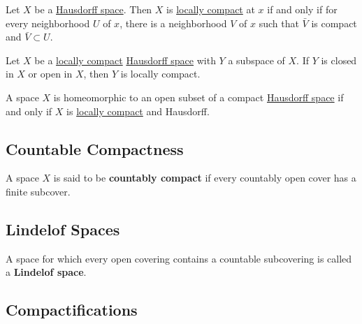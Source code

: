   \begin{lemma}
    \label{thm:local-compactness-in-hausdorff-spaces}
    Let $X$ be a \hyperref[def:hausdorff-space]{Hausdorff space}. Then $X$ is \hyperref[def:locally-compact]{locally compact} at $x$ if and only if for every neighborhood $U$ of $x$, there is a neighborhood $V$ of $x$ such that $\bar{V}$ is compact and $\bar{V} \subset U$. 
  \end{lemma}

  \begin{corollary}
    \label{thm:subspaces-of-locally-compact-hausdorff-spaces}
    Let $X$ be a \hyperref[def:locally-compact]{locally compact} \hyperref[def:hausdorff-space]{Hausdorff space} with $Y$ a subspace of $X$. If $Y$ is closed in $X$ or open in $X$, then $Y$ is locally compact. 
  \end{corollary}

  \begin{corollary}
    \label{thm:local-compactness-via-open-embedding}
    A space $X$ is homeomorphic to an open subset of a compact \hyperref[def:hausdorff-space]{Hausdorff space} if and only if $X$ is \hyperref[def:locally-compact]{locally compact} and Hausdorff. 
  \end{corollary}

\subsection{Countable Compactness}

  \begin{definition}
    \label{def:countably-compact}
    A space $X$ is said to be \textbf{countably compact} if every countably open cover has a finite subcover. 
  \end{definition}

\subsection{Lindelof Spaces} 

  \begin{definition}
    \label{def:lindelof-space}
    A space for which every open covering contains a countable subcovering is called a \textbf{Lindelof space}. 
  \end{definition}

\subsection{Compactifications}
  
